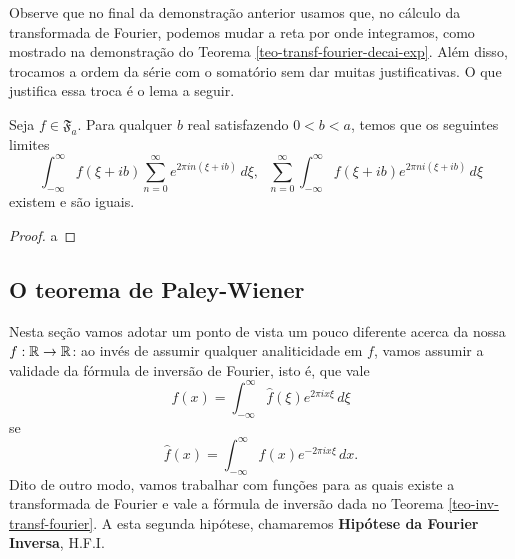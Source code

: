         Observe que no final da demonstração anterior usamos que, no cálculo da 
        transformada de Fourier, podemos mudar a reta por onde integramos, como mostrado 
        na demonstração do Teorema \ref{teo-transf-fourier-decai-exp}. Além disso, trocamos
        a ordem da série com o somatório sem dar muitas justificativas. 
        O que justifica essa troca é o lema a seguir.
        \begin{lema}
            Seja $f \in \mathfrak{F}_a$. Para qualquer $b$ real satisfazendo $0 < b < a$, 
            temos que os seguintes limites
            \begin{equation*}
            \int_{-\infty}^{\infty}f(\xi + ib)\sum_{n=0}^{\infty}e^{2\pi i n(\xi + ib)}\,d\xi, 
            \hspace{7pt}
            \sum_{n=0}^{\infty} \int_{-\infty}^{\infty}f(\xi + ib)e^{2\pi ni(\xi + ib)}\,d\xi
            \end{equation*}
            existem e são iguais.
        \end{lema}
        \begin{proof}
            a
        \end{proof}
    \subsection{O teorema de Paley-Wiener}
        Nesta seção vamos adotar um ponto de vista um pouco diferente acerca da nossa $f:\mathbb{R}\to\mathbb{R}$: 
        ao invés de assumir qualquer analiticidade em $f$, vamos assumir a validade da fórmula de 
        inversão de Fourier, isto é,
        que vale
        \begin{equation*}
            f(x) = \int_{-\infty}^{\infty} \widehat{f}(\xi) e^{2\pi ix\xi} \, d\xi
        \end{equation*}
        se
        \begin{equation*}
            \widehat{f}(x) = \int_{-\infty}^{\infty} f(x) e^{-2\pi ix\xi} \, dx.
        \end{equation*}
        Dito de outro modo, vamos trabalhar com funções para as quais existe a transformada de Fourier
        e vale a fórmula de inversão dada no Teorema \ref{teo-inv-transf-fourier}. A esta segunda
        hipótese, chamaremos {\bf Hipótese da Fourier Inversa}, H.F.I.
        
